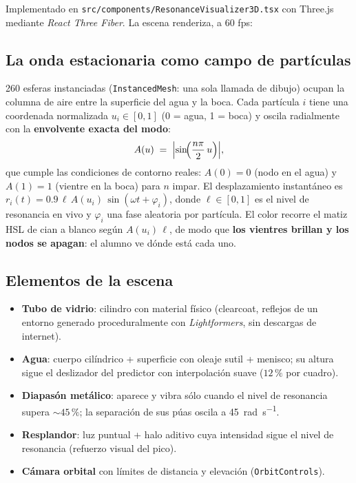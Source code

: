 \documentclass[11pt,a4paper]{article}
\begin{document}
Implementado en \texttt{src/components/ResonanceVisualizer3D.tsx} con Three.js mediante
\emph{React Three Fiber}. La escena renderiza, a 60 fps:

\subsection{La onda estacionaria como campo de partículas}

260 esferas instanciadas (\texttt{InstancedMesh}: una sola llamada de dibujo) ocupan la
columna de aire entre la superficie del agua y la boca. Cada partícula $i$ tiene una
coordenada normalizada $u_i \in [0,1]$ (0 = agua, 1 = boca) y oscila radialmente con la
\textbf{envolvente exacta del modo}:
\begin{equation}
  A(u) \;=\; \Bigl\lvert \sin\!\Bigl(\frac{n\pi}{2}\,u\Bigr) \Bigr\rvert ,
  \label{eq:envolvente}
\end{equation}
que cumple las condiciones de contorno reales: $A(0)=0$ (nodo en el agua) y $A(1)=1$
(vientre en la boca) para $n$ impar. El desplazamiento instantáneo es
$r_i(t) = 0.9\,\ell\,A(u_i)\,\sin(\omega t + \varphi_i)$, donde $\ell \in [0,1]$ es el nivel
de resonancia en vivo y $\varphi_i$ una fase aleatoria por partícula. El color recorre el
matiz HSL de cian a blanco según $A(u_i)\,\ell$, de modo que \textbf{los vientres brillan y
los nodos se apagan}: el alumno ve dónde está cada uno.

\subsection{Elementos de la escena}

\begin{itemize}[nosep]
  \item \textbf{Tubo de vidrio}: cilindro con material físico (clearcoat, reflejos de un
        entorno generado proceduralmente con \emph{Lightformers}, sin descargas de internet).
  \item \textbf{Agua}: cuerpo cilíndrico + superficie con oleaje sutil + menisco; su altura
        sigue el deslizador del predictor con interpolación suave ($12\,\%$ por cuadro).
  \item \textbf{Diapasón metálico}: aparece y vibra sólo cuando el nivel de resonancia supera
        $\sim\!45\,\%$; la separación de sus púas oscila a \SI{45}{\radian\per\second}.
  \item \textbf{Resplandor}: luz puntual + halo aditivo cuya intensidad sigue el nivel de
        resonancia (refuerzo visual del pico).
  \item \textbf{Cámara orbital} con límites de distancia y elevación
        (\texttt{OrbitControls}).
\end{itemize}
\end{document}
